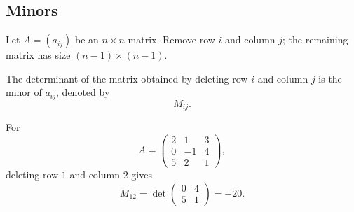 \subsection{Minors}

Let $A=(a_{ij})$ be an $n\times n$ matrix. Remove row $i$ and column $j$; the remaining matrix has size $(n-1)\times(n-1)$.

\begin{definitionbox}
The determinant of the matrix obtained by deleting row $i$ and column $j$ is the minor of $a_{ij}$, denoted by
\[
M_{ij}.
\]
\end{definitionbox}

\begin{examplebox}
For
\[
A=\begin{pmatrix}
2&1&3\\0&-1&4\\5&2&1
\end{pmatrix},
\]
deleting row $1$ and column $2$ gives
\[
M_{12}=\det\begin{pmatrix}0&4\\5&1\end{pmatrix}=-20.
\]
\end{examplebox}
